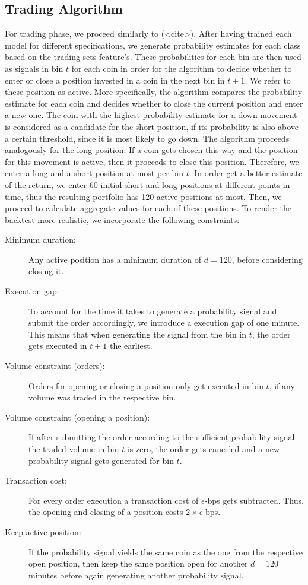 \subsection{Trading Algorithm}
For trading phase, we proceed similarly to (<cite>).
After having trained each model for different specifications, we generate probability estimates for each class
based on the trading sets feature's. These probabilities for each bin are then used as signals in bin $t$ for each coin
in order for the algorithm to decide whether to enter or close a position invested in a coin in the next bin in $ t + 1 $.
We refer to these position as active.
More specifically, the algorithm compares the probability estimate for each coin and decides 
whether to close the current position and enter a new one. The coin with the highest probability estimate for a down movement
is considered as a candidate for the short position, if its probability is also above a certain threshold,
since it is most likely to go down. 
The algorithm proceeds analogously for the long position. 
If a coin gets chosen this way and the position for this movement is active, then it proceeds to close this position.
Therefore, we enter a long and a short position at most per bin $ t $.
In order get a better estimate of the return, we enter 60 initial short and long positions at different points in time,
thus the resulting portfolio has 120 active positions at most.
Then, we proceed to calculate aggregate values for each of these positions. To render the backtest more
realistic, we incorporate the following constraints:

\begin{description}
    \item[Minimum duration:] {
        Any active position has a minimum duration of $ d = 120 $, before considering closing it.
    }
    \item[Execution gap:] {
        To account for the time it takes to generate a probability signal and submit the order accordingly,
        we introduce a execution gap of one minute. This means that when generating the signal from the bin in $ t $,
        the order gets executed in $ t + 1 $ the earliest.
    }
    \item[Volume constraint (orders):] { 
        Orders for opening or closing a position only get executed in bin $ t $, 
        if any volume was traded in the respective bin.
    }
    \item[Volume constraint (opening a position):] {
        If after submitting the order according to the sufficient probability signal the traded volume in bin $ t $
        is zero, the order gets canceled and a new probability signal gets generated for bin $ t $.
    }
    \item[Transaction cost:] {
        For every order execution a transaction cost of $ \epsilon $-bps gets subtracted. 
        Thus, the opening and closing of a position costs $ 2 \times \epsilon $-bps.
    }
    \item[Keep active position:] {
        If the probability signal yields the same coin as the one from the respective open position,
        then keep the same position open for another $ d=120 $ minutes before again generating another
        probability signal.
    }
\end{description}
